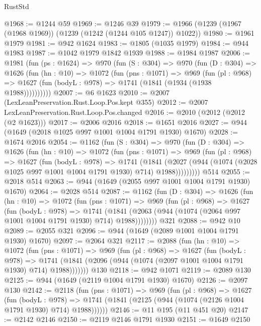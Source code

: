 \begin{lexlean}{RustStd}
\begin{coremodule}
{\begin{coremodule}
{{{{{{{{{{@1968 := @1244 @59
@1969 := @1246 @39
@1979 := @1966 (@1239 (@1967 (@1968 @1969)) (@1239 (@1242 (@1244 @105 @1247)) @1022))
@1980 := @1961 @1979
@1981 := @942 @1624
@1983 := @1805 (@1035 @1979)
@1984 := @944 @1983
@1987 := @1042 @1979 @1842 @1939
@1988 := @1984 @1987
@2006 := @1981
    (fun (ps : @1624) =>
    @970
      (fun (S : @304) =>
      @970
        (fun (D : @304) =>
        @1626
          (fun (hn : @10) =>
          @1072
            (fun (pns : @1071) =>
            @969
              (fun (pl : @968) =>
              @1627 (fun (bodyL : @978) => @1741 (@1841 (@1934 (@1938 @1988))))))))))
@2007 := @6 @1623
@2010 := @2007 (LexLeanPreservation.Rust.Loop.Pos.kept @355)
@2012 := @2007 LexLeanPreservation.Rust.Loop.Pos.changed
@2016 := @2010 (@2012 (@2012 (@2 @1623)))
@2017 := @2006 @2016
@2018 := @1651 @2016
@2027 := @944 (@1649 (@2018 @1025 @997 @1001 @1004 @1791 @1930) @1670)
@2028 := @1674 @2016
@2054 := @1162
    (fun (S : @304) =>
    @970
      (fun (D : @304) =>
      @1626
        (fun (hn : @10) =>
        @1072
          (fun (pns : @1071) =>
          @969
            (fun (pl : @968) =>
            @1627
              (fun (bodyL : @978) =>
              @1741
                (@1841
                  (@2027
                    (@944 (@1074 (@2028 @1025 @997 @1001 @1004 @1791 @1930) @714) @1988)))))))))
    @514
@2055 := @2018 @514
@2063 := @944 (@1649 (@2055 @997 @1001 @1004 @1791 @1930) @1670)
@2064 := @2028 @514
@2087 := @1162
    (fun (D : @304) =>
    @1626
      (fun (hn : @10) =>
      @1072
        (fun (pns : @1071) =>
        @969
          (fun (pl : @968) =>
          @1627
            (fun (bodyL : @978) =>
            @1741
              (@1841 (@2063 (@944 (@1074 (@2064 @997 @1001 @1004 @1791 @1930) @714) @1988))))))))
    @321
@2088 := @942 @10
@2089 := @2055 @321
@2096 := @944 (@1649 (@2089 @1001 @1004 @1791 @1930) @1670)
@2097 := @2064 @321
@2117 := @2088
    (fun (hn : @10) =>
    @1072
      (fun (pns : @1071) =>
      @969
        (fun (pl : @968) =>
        @1627
          (fun (bodyL : @978) =>
          @1741 (@1841 (@2096 (@944 (@1074 (@2097 @1001 @1004 @1791 @1930) @714) @1988)))))))
    @130
@2118 := @942 @1071
@2119 := @2089 @130
@2125 := @944 (@1649 (@2119 @1004 @1791 @1930) @1670)
@2126 := @2097 @130
@2142 := @2118
    (fun (pns : @1071) =>
    @969
      (fun (pl : @968) =>
      @1627
        (fun (bodyL : @978) =>
        @1741 (@1841 (@2125 (@944 (@1074 (@2126 @1004 @1791 @1930) @714) @1988))))))
@2146 := @11 @195 (@11 @451 @20)
@2147 := @2142 @2146
@2150 := @2119 @2146 @1791 @1930
@2151 := @1649 @2150
}}}}}}}}}}
\end{coremodule}}
\end{coremodule}
\end{lexlean}
